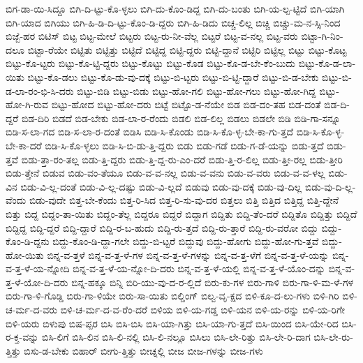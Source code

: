 {ಬಿಗ-ಡಾ-ಯಿ-ಸಿದ್ದೂ
ಬಿಗಿ-ದಿ-ಟ್ಟು-ಕೊ-ಳ್ಳಲು
ಬಿಗಿ-ದು-ಕೊಂ-ಡಿದ್ದ
ಬಿಗಿ-ದು-ಬಂತು
ಬಿಗಿ-ಯ-ಲ್ಪ-ಟ್ಟಿದೆ
ಬಿಗಿ-ಯಾಗಿ
ಬಿಗಿ-ಯಾದ
ಬಿಗಿಯು
ಬಿಗಿ-ಹಿ-ಡಿ-ದಿ-ಟ್ಟು-ಕೊಂ-ಡಿ-ದ್ದರು
ಬಿಗಿ-ಹಿ-ಡಿದು
ಬಿಚ್ಚ-ಲಿಲ್ಲ
ಬಿಚ್ಚಿ
ಬಿಚ್ಚು-ಮ-ನ-ಸ್ಸಿ-ನಿಂದ
ಬಿಜ್ಬೆ-ಹರ
ಬಿಟಿಸ್
ಬಿಟ್ಟ
ಬಿಟ್ಟ-ಮೇಲೆ
ಬಿಟ್ಟರು
ಬಿಟ್ಟ-ರು-ನೀ-ವೆಲ್ಲ
ಬಿಟ್ಟರೆ
ಬಿಟ್ಟ-ವ-ನಲ್ಲ
ಬಿಟ್ಟ-ವರು
ಬಿಟ್ಟಾ-ಗಿ-ನಿಂ-ದಲೂ
ಬಿಟ್ಟಾ-ರೆಯೇ
ಬಿಟ್ಟಿತು
ಬಿಟ್ಟಿತ್ತು
ಬಿಟ್ಟಿದೆ
ಬಿಟ್ಟಿದ್ದ
ಬಿಟ್ಟಿ-ದ್ದರು
ಬಿಟ್ಟಿ-ದ್ದಾನೆ
ಬಿಟ್ಟಿರಿ
ಬಿಟ್ಟಿಲ್ಲ
ಬಿಟ್ಟು
ಬಿಟ್ಟು-ಕೊಟ್ಟ
ಬಿಟ್ಟು-ಕೊ-ಟ್ಟರು
ಬಿಟ್ಟು-ಕೊ-ಟ್ಟಿ-ದ್ದರು
ಬಿಟ್ಟು-ಕೊಟ್ಟು
ಬಿಟ್ಟು-ಕೊಡ
ಬಿಟ್ಟು-ಕೊ-ಡ-ಬೇ-ಕೆಂ-ಬುದು
ಬಿಟ್ಟು-ಕೊ-ಡ-ಲಾ-ಯಿತು
ಬಿಟ್ಟು-ಕೊ-ಡಲು
ಬಿಟ್ಟು-ಕೊ-ಡು-ವು-ದಕ್ಕೆ
ಬಿಟ್ಟು-ಬಿ-ಟ್ಟರು
ಬಿಟ್ಟು-ಬಿ-ಟ್ಟಿ-ದ್ದಾರೆ
ಬಿಟ್ಟು-ಬಿ-ಡ-ಬೇಕು
ಬಿಟ್ಟು-ಬಿ-ಡ-ಲಾ-ರಂ-ಭಿ-ಸಿ-ದರು
ಬಿಟ್ಟು-ಬಿಡಿ
ಬಿಟ್ಟು-ಬಿಡು
ಬಿಟ್ಟು-ಹೋ-ಗಲಿ
ಬಿಟ್ಟು-ಹೋ-ಗಲು
ಬಿಟ್ಟು-ಹೋ-ಗಿದ್ದ
ಬಿಟ್ಟು-ಹೋ-ಗಿ-ರುವ
ಬಿಟ್ಟು-ಹೋದ
ಬಿಟ್ಟು-ಹೋ-ದರು
ಬಿಟ್ಟೆ
ಬಿಟ್ಟೊ-ಡ-ನೆಯೇ
ಬಿಡ
ಬಿಡ-ದಂ-ತಹ
ಬಿಡ-ದಂತೆ
ಬಿಡ-ದಿ-ದ್ದರೆ
ಬಿಡ-ದಿರಿ
ಬಿಡದೆ
ಬಿಡ-ಬೇಕು
ಬಿಡ-ಲಾ-ರ-ರೆಂದು
ಬಿಡಲಿ
ಬಿಡ-ಲಿಲ್ಲ
ಬಿಡಲು
ಬಿಡಲೇ
ಬಿಡಿ
ಬಿಡಿ-ಗಾ-ಸನ್ನೂ
ಬಿಡಿ-ಸ-ಲಾ-ಗದ
ಬಿಡಿ-ಸ-ಲಾ-ರ-ದಂತೆ
ಬಿಡಿಸಿ
ಬಿಡಿ-ಸಿ-ಕೊಂಡು
ಬಿಡಿ-ಸಿ-ಕೊ-ಳ್ಳ-ಬೇ-ಕಾ-ಗು-ತ್ತದೆ
ಬಿಡಿ-ಸಿ-ಕೊ-ಳ್ಳ-ಬೇ-ಕಾ-ದರೆ
ಬಿಡಿ-ಸಿ-ಕೊ-ಳ್ಳಲು
ಬಿಡಿ-ಸಿ-ಬಿ-ಡು-ತ್ತಿ-ದ್ದರು
ಬಿಡು
ಬಿಡು-ಗಡೆ
ಬಿಡು-ಗ-ಡೆ-ಯನ್ನು
ಬಿಡು-ತ್ತದೆ
ಬಿಡು-ತ್ತವೆ
ಬಿಡು-ತ್ತಾ-ರಂ-ತಲ್ಲ
ಬಿಡು-ತ್ತಿ-ದ್ದರು
ಬಿಡು-ತ್ತಿ-ದ್ದ-ರು-ಎಂ-ದರೆ
ಬಿಡು-ತ್ತಿ-ರ-ಲಿಲ್ಲ
ಬಿಡು-ತ್ತೀ-ರಲ್ಲ
ಬಿಡು-ತ್ತೀರಿ
ಬಿಡು-ತ್ತೇನೆ
ಬಿಡುವ
ಬಿಡು-ವಂ-ತೆಯೂ
ಬಿಡು-ವ-ವ-ನಲ್ಲ
ಬಿಡು-ವ-ವನು
ಬಿಡು-ವ-ವರು
ಬಿಡು-ವ-ವ-ಳಲ್ಲ
ಬಿಡು-ವಿನ
ಬಿಡು-ವಿ-ಲ್ಲ-ದಂತೆ
ಬಿಡು-ವಿ-ಲ್ಲ-ದಷ್ಟು
ಬಿಡು-ವಿ-ಲ್ಲದೆ
ಬಿಡುವು
ಬಿಡು-ವು-ದಕ್ಕೆ
ಬಿಡು-ವು-ದಿಲ್ಲ
ಬಿಡು-ವು-ದಿ-ಲ್ಲ-ವೆಂದು
ಬಿಡು-ವುದೇ
ಬಿತ್ತ-ಬೇ-ಕೆಂದು
ಬಿತ್ತ-ರಿ-ಸಿದ
ಬಿತ್ತ-ರಿ-ಸು-ವು-ದರ
ಬಿತ್ತಲು
ಬಿತ್ತಿ
ಬಿತ್ತಿದ
ಬಿತ್ತಿದ್ದ
ಬಿತ್ತಿ-ದ್ದೇನೆ
ಬಿತ್ತು
ಬಿದ್ದ
ಬಿದ್ದಂ-ತಾ-ಯಿತು
ಬಿದ್ದಂ-ತೆಲ್ಲ
ಬಿದ್ದರೂ
ಬಿದ್ದರೆ
ಬಿದ್ದಾಗ
ಬಿದ್ದಿತು
ಬಿದ್ದಿ-ತೆಂ-ದರೆ
ಬಿದ್ದಿತೊ
ಬಿದ್ದಿತ್ತು
ಬಿದ್ದಿದೆ
ಬಿದ್ದಿದ್ದ
ಬಿದ್ದಿ-ದ್ದರೆ
ಬಿದ್ದಿ-ದ್ದಾರೆ
ಬಿದ್ದಿ-ರ-ಬ-ಹುದು
ಬಿದ್ದಿ-ರು-ತ್ತದೆ
ಬಿದ್ದಿ-ರು-ತ್ತಾರೆ
ಬಿದ್ದಿ-ರು-ವರೋ
ಬಿದ್ದು
ಬಿದ್ದು-ಕೊಂ-ಡಿ-ದ್ದನು
ಬಿದ್ದು-ಕೊಂ-ಡಿ-ದ್ದಾ-ಗಲೇ
ಬಿದ್ದು-ಬಿ-ಟ್ಟರೆ
ಬಿದ್ದುವು
ಬಿದ್ದು-ಹೋಗು
ಬಿದ್ದು-ಹೋ-ಗು-ತ್ತವೆ
ಬಿದ್ದು-ಹೋ-ಯಿತು
ಬಿನ್ನ-ವ-ತ್ತಳೆ
ಬಿನ್ನ-ವ-ತ್ತ-ಳೆ-ಗಳ
ಬಿನ್ನ-ವ-ತ್ತ-ಳೆ-ಗಳನ್ನು
ಬಿನ್ನ-ವ-ತ್ತ-ಳೆಗೆ
ಬಿನ್ನ-ವ-ತ್ತ-ಳೆ-ಯನ್ನು
ಬಿನ್ನ-ವ-ತ್ತ-ಳೆ-ಯ-ನ್ನೋದಿ
ಬಿನ್ನ-ವ-ತ್ತ-ಳೆ-ಯ-ನ್ನೋ-ದಿ-ದರು
ಬಿನ್ನ-ವ-ತ್ತ-ಳೆ-ಯಲ್ಲಿ
ಬಿನ್ನ-ವ-ತ್ತ-ಳೆ-ಯೊಂ-ದನ್ನು
ಬಿನ್ನ-ವ-ತ್ತ-ಳೆ-ಯೋ-ದಿ-ದರು
ಬಿನ್ನ-ಹಕ್ಕೂ
ಬಿನ್ನಿ
ಬಿರಿ-ಯು-ವು-ದ-ರ-ಲ್ಲಿದೆ
ಬಿರು-ಕು-ಗಳ
ಬಿರು-ಗಾಳಿ
ಬಿರು-ಗಾ-ಳಿ-ಮ-ಳೆ-ಗಳ
ಬಿರು-ಗಾ-ಳಿ-ಗೊಡ್ಡಿ
ಬಿರು-ಗಾ-ಳಿಯೇ
ಬಿರು-ಸಾ-ಯಿತು
ಬಿಲ್ಡಿಂಗ್
ಬಿಲ್ವ-ವೃ-ಕ್ಷದ
ಬಿಳಿ-ಕೂ-ದ-ಲು-ಗಳು
ಬಿಳಿ-ಗಿರಿ
ಬಿಳಿ-ಚ-ರ್ಮ-ದ-ವರು
ಬಿಳಿ-ಚ-ರ್ಮ-ದ-ವ-ರೆಂ-ದರೆ
ಬಿಳಿಯ
ಬಿಳಿ-ಯ-ಗಡ್ಡ
ಬಿಳಿ-ಯನ
ಬಿಳಿ-ಯ-ರನ್ನು
ಬಿಳಿ-ಯ-ರಿಗೇ
ಬಿಳಿ-ಯರು
ಬಿಳುಪು
ಬಿಷ-ಪ್ಪರ
ಬಿಸಿ
ಬಿಸಿ-ಬಿಸಿ
ಬಿಸಿ-ಯಾ-ಗಿತ್ತು
ಬಿಸಿ-ಯಾ-ಗು-ತ್ತದೆ
ಬಿಸಿ-ಯಿಂದ
ಬಿಸಿ-ಯೇ-ರಿದ
ಬಿಸಿ-ರ-ಕ್ತ-ವನ್ನು
ಬಿಸಿ-ಲಿಗೆ
ಬಿಸಿ-ಲಿನ
ಬಿಸಿ-ಲಿ-ನಲ್ಲಿ
ಬಿಸಿ-ಲಿ-ನಲ್ಲೂ
ಬಿಸಿಲು
ಬಿಸಿ-ಲೇ-ರಿತ್ತು
ಬಿಸಿ-ಲೇ-ರಿ-ದಾಗ
ಬಿಸಿ-ಲೇ-ರು-ತ್ತಿತ್ತು
ಬಿಸು-ಡ-ಬೇಕು
ಬಿಹಾರ್
ಬೀಗು-ತ್ತಿತ್ತು
ಬೀಚ್ನಲ್ಲಿ
ಬೀಜ
ಬೀಜ-ಗಳನ್ನು
ಬೀಜ-ಗಳು
}
